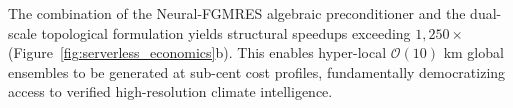 The combination of the Neural-FGMRES algebraic preconditioner and the dual-scale topological formulation yields structural speedups exceeding $1,250\times$ (Figure~\ref{fig:serverless_economics}b). This enables hyper-local $\mathcal{O}(10)$ km global ensembles to be generated at sub-cent cost profiles, fundamentally democratizing access to verified high-resolution climate intelligence.
